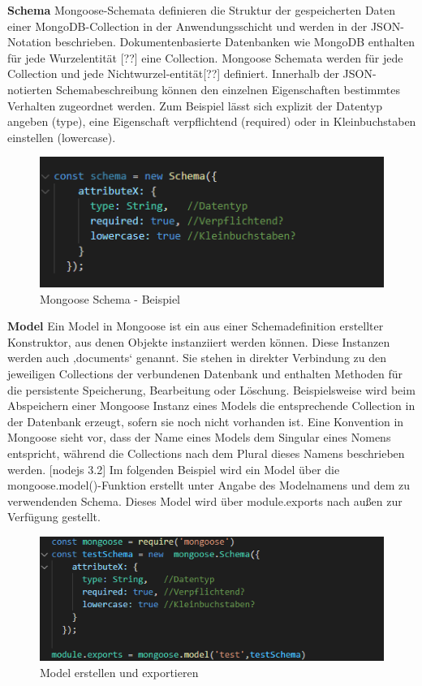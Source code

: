 \textbf{Schema}
\newline
Mongoose-Schemata definieren die Struktur der gespeicherten Daten einer MongoDB-Collection in der Anwendungsschicht und werden in der JSON-Notation beschrieben. Dokumentenbasierte Datenbanken wie MongoDB enthalten für jede Wurzelentität [??] eine Collection. Mongoose Schemata werden für jede Collection und jede Nichtwurzel-entität[??] definiert. Innerhalb der JSON-notierten Schemabeschreibung können den einzelnen Eigenschaften bestimmtes Verhalten zugeordnet werden. Zum Beispiel lässt sich explizit der Datentyp angeben (type), eine Eigenschaft verpflichtend (required) oder in Kleinbuchstaben einstellen (lowercase).
\newline

\begin{figure}[h]
\centering
\includegraphics{images/nodeJS_mongooseSchema.PNG}
\caption{Mongoose Schema - Beispiel}
\end{figure}

\newpage
\textbf{Model}
\newline
Ein Model in Mongoose ist ein aus einer Schemadefinition erstellter Konstruktor, aus denen Objekte instanziiert werden können. Diese Instanzen werden auch ‚documents‘ genannt. Sie stehen in direkter Verbindung zu den jeweiligen Collections der verbundenen Datenbank und enthalten Methoden für die persistente Speicherung, Bearbeitung oder Löschung. Beispielsweise wird beim Abspeichern einer Mongoose Instanz eines Models die entsprechende Collection in der Datenbank erzeugt, sofern sie noch nicht vorhanden ist. Eine Konvention in Mongoose sieht vor, dass der Name eines Models dem Singular eines Nomens entspricht, während die Collections nach dem Plural dieses Namens beschrieben werden. [nodejs 3.2] Im folgenden Beispiel wird ein Model über die mongoose.model()-Funktion erstellt unter Angabe des Modelnamens und dem zu verwendenden Schema. Dieses Model wird über module.exports nach außen zur Verfügung gestellt.

\begin{figure}[h]
\centering
\includegraphics{images/nodeJS_mongooseModell.PNG}
\caption{Model erstellen und exportieren}
\end{figure}

